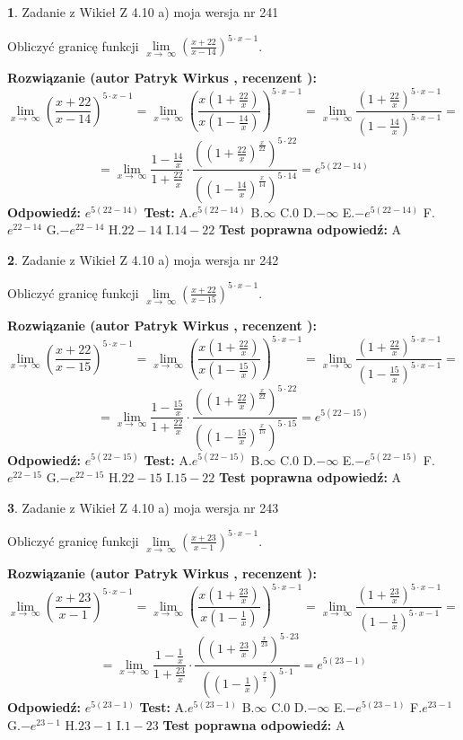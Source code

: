 \documentclass[12pt, a4paper]{article}
\theoremstyle{definition} %
\newtheorem{zad}{}
\newcommand{\zadStart}[1]{\begin{zad}#1\newline}
\newcommand{\zadStop}{\end{zad}}
\newcommand{\rozwStart}[2]{\noindent \textbf{Rozwiązanie (autor #1 , recenzent #2): }\newline}
\newcommand{\rozwStop}{\newline}
\newcommand{\odpStart}{\noindent \textbf{Odpowiedź:}\newline}
\newcommand{\odpStop}{\newline}
\newcommand{\testStart}{\noindent \textbf{Test:}\newline}
\newcommand{\testStop}{\newline}
\newcommand{\kluczStart}{\noindent \textbf{Test poprawna odpowiedź:}\newline}
\newcommand{\kluczStop}{\newline}
\begin{document}
\zadStart{Zadanie z Wikieł Z 4.10 a) moja wersja nr 241}


Obliczyć granicę funkcji  $\lim\limits_{x\to\ \infty}(\frac{x+22}{x-14})^{5\cdot x-1}$.
\zadStop
\rozwStart{Patryk Wirkus}{}
$$\lim\limits_{x\to\ \infty}(\frac{x+22}{x-14})^{5\cdot x-1} = \lim\limits_{x\to\ \infty}(\frac{x(1+\frac{22}{x})}{x(1-\frac{14}{x})})^{5\cdot x-1}=\lim\limits_{x\to\ \infty}\frac{(1+\frac{22}{x})^{5\cdot x-1}}{(1-\frac{14}{x})^{5\cdot x-1}}=$$
$$=\lim\limits_{x\to\ \infty}\frac{1-\frac{14}{x}}{1+\frac{22}{x}}\cdot\frac{((1+\frac{22}{x})^{\frac{x}{22}})^{5\cdot22}}{((1-\frac{14}{x})^{\frac{x}{14}})^{5\cdot14}}=e^{5(22-14)}$$
\rozwStop
\odpStart
$e^{5(22-14)}$
\odpStop
\testStart
A.$e^{5(22-14)}$ B.$\infty$ C.$0$ D.$-\infty$ E.$-e^{5(22-14)}$
F.$e^{22-14}$ G.$-e^{22-14}$
H.$22-14$
I.$14-22$
\testStop
\kluczStart
A
\kluczStop



\zadStart{Zadanie z Wikieł Z 4.10 a) moja wersja nr 242}


Obliczyć granicę funkcji  $\lim\limits_{x\to\ \infty}(\frac{x+22}{x-15})^{5\cdot x-1}$.
\zadStop
\rozwStart{Patryk Wirkus}{}
$$\lim\limits_{x\to\ \infty}(\frac{x+22}{x-15})^{5\cdot x-1} = \lim\limits_{x\to\ \infty}(\frac{x(1+\frac{22}{x})}{x(1-\frac{15}{x})})^{5\cdot x-1}=\lim\limits_{x\to\ \infty}\frac{(1+\frac{22}{x})^{5\cdot x-1}}{(1-\frac{15}{x})^{5\cdot x-1}}=$$
$$=\lim\limits_{x\to\ \infty}\frac{1-\frac{15}{x}}{1+\frac{22}{x}}\cdot\frac{((1+\frac{22}{x})^{\frac{x}{22}})^{5\cdot22}}{((1-\frac{15}{x})^{\frac{x}{15}})^{5\cdot15}}=e^{5(22-15)}$$
\rozwStop
\odpStart
$e^{5(22-15)}$
\odpStop
\testStart
A.$e^{5(22-15)}$ B.$\infty$ C.$0$ D.$-\infty$ E.$-e^{5(22-15)}$
F.$e^{22-15}$ G.$-e^{22-15}$
H.$22-15$
I.$15-22$
\testStop
\kluczStart
A
\kluczStop



\zadStart{Zadanie z Wikieł Z 4.10 a) moja wersja nr 243}


Obliczyć granicę funkcji  $\lim\limits_{x\to\ \infty}(\frac{x+23}{x-1})^{5\cdot x-1}$.
\zadStop
\rozwStart{Patryk Wirkus}{}
$$\lim\limits_{x\to\ \infty}(\frac{x+23}{x-1})^{5\cdot x-1} = \lim\limits_{x\to\ \infty}(\frac{x(1+\frac{23}{x})}{x(1-\frac{1}{x})})^{5\cdot x-1}=\lim\limits_{x\to\ \infty}\frac{(1+\frac{23}{x})^{5\cdot x-1}}{(1-\frac{1}{x})^{5\cdot x-1}}=$$
$$=\lim\limits_{x\to\ \infty}\frac{1-\frac{1}{x}}{1+\frac{23}{x}}\cdot\frac{((1+\frac{23}{x})^{\frac{x}{23}})^{5\cdot23}}{((1-\frac{1}{x})^{\frac{x}{1}})^{5\cdot1}}=e^{5(23-1)}$$
\rozwStop
\odpStart
$e^{5(23-1)}$
\odpStop
\testStart
A.$e^{5(23-1)}$ B.$\infty$ C.$0$ D.$-\infty$ E.$-e^{5(23-1)}$
F.$e^{23-1}$ G.$-e^{23-1}$
H.$23-1$
I.$1-23$
\testStop
\kluczStart
A
\kluczStop
\end{document}
